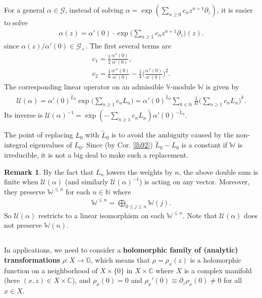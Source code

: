 \documentclass[11pt,b5paper,notitlepage]{article}
\theoremstyle{definition}
\newtheorem{rem}[df]{Remark}
\theoremstyle{plain}
\newcommand{\mc}{\mathcal}
\newcommand{\wtd}{\widetilde}
\newcommand{\blt}{\bullet}
\newcommand{\Vbb}{\mathbb V}
\newcommand{\Wbb}{\mathbb W}
\newcommand{\Gbb}{\mathbb G}
\newcommand{\Cbb}{\mathbb C}
\newcommand{\Nbb}{\mathbb N}
\numberwithin{equation}{section}
\begin{document}
For a general $\alpha\in\mc G$, instead of solving $\alpha=\exp(\sum_{n\geq 0}c_n z^{n+1}\partial_z)$, it is easier to solve
\begin{align}
\alpha(z)=\alpha'(0)\cdot \exp\Big(\sum_{n\geq 1} c_nz^{n+1}\partial_z\Big)(z).	
\end{align}
since $\alpha(z)/\alpha'(0)\in\mc G_+$. The first several terms are
\begin{subequations}
\begin{gather}
c_1=\frac 12\frac{\alpha''(0)}{\alpha'(0)},\\
c_2=\frac 16\frac{\alpha'''(0)}{\alpha'(0)}-\frac 14\Big(\frac{\alpha''(0)}{\alpha'(0)}\Big)^2.
\end{gather}
\end{subequations}
The corresponding linear operator on an admissible $\Vbb$-module $\Wbb$ is given by \index{U@$\mc U(\alpha),\mc U(\eta),\mc U(\eta_\blt)$}
\begin{align}
\mc U(\alpha)=\alpha'(0)^{\wtd L_0}\exp\Big(\sum_{n\geq1} c_nL_n\Big)=	\alpha'(0)^{\wtd L_0}\sum_{k\in\Nbb}\frac 1{k!}\Big(\sum_{n\geq 1}c_n L_n\Big)^k.\label{eq192}
\end{align}
Its inverse is $\mc U(\alpha)^{-1}=\exp(-\sum_{n\geq 1}c_nL_n)\alpha'(0)^{-\wtd L_0}$.

The point of replacing $L_0$ with $\wtd L_0$  is to avoid the ambiguity caused by the non-integral eigenvalues of $L_0$. Since (by Cor. \ref{lb92}) $\wtd L_0-L_0$ is a constant if $\Wbb$ is irreducible,  it is not a big deal to make such a replacement.


\begin{rem}
By the fact that $L_n$ lowers the weights by $n$, the  above double sum is finite when $\mc U(\alpha)$ (and similarly $\mc U(\alpha)^{-1}$) is acting on any vector. Moreover, they preserve $\Wbb^{\leq n}$ for each $n\in\Nbb$ where \index{W@$\Wbb^{\leq n}$}
\begin{align}
\Wbb^{\leq n}=\bigoplus_{0\leq j\leq n}\Wbb(j).	
\end{align}
So $\mc U(\alpha)$ restricts to a linear isomorphism on each $\Wbb^{\leq n}$. Note that $\mc U(\alpha)$ does not preserve $\Wbb(n)$.
\end{rem}




\subsection{}\label{lb97}


In applications, we need to consider a \textbf{holomorphic family of (analytic) transformations}   $\rho:X\rightarrow\Gbb$, which means that $\rho=\rho_x(z)$ is a holomorphic function on a neighborhood of $X\times \{0\}$ in $X\times\Cbb$ where $X$ is a complex manifold (here $(x,z)\in X\times \Cbb$), and $\rho_x(0)=0$ and $\rho_x'(0)\equiv\partial_z\rho_x(0)\neq0$ for all $x\in X$.  
\end{document}

